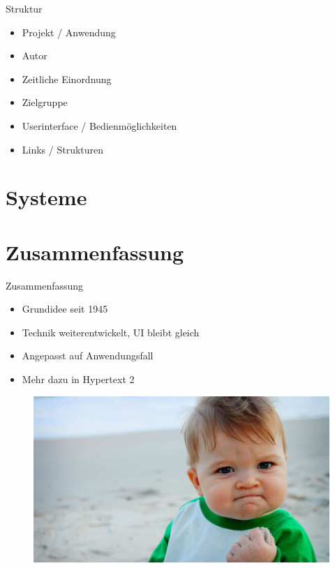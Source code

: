 \documentclass{beamer}
\begin{document}
\begin{frame}{Struktur}
\begin{itemize}
	\item Projekt / Anwendung
	\item Autor
	\item Zeitliche Einordnung
	\item Zielgruppe
	\item Userinterface / Bedienmöglichkeiten
	\item Links / Strukturen
\end{itemize}
\end{frame}

\section{Systeme}







%
%
%

\section{Zusammenfassung}
\begin{frame}{Zusammenfassung}
	\begin{itemize}
		\item Grundidee seit 1945
		\item Technik weiterentwickelt, UI bleibt gleich
		\item Angepasst auf Anwendungsfall
		\item Mehr dazu in Hypertext 2
	\end{itemize}
\end{frame}

\begin{frame}{}
	\begin{figure}[htbp]
		\centering
		\includegraphics[width=1.0\textwidth]{images/success}
	\end{figure}
\end{frame}
\end{document}
